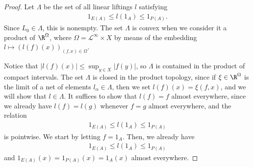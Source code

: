 \documentclass[10pt]{mypackage}
\begin{document}
\begin{proof}
  Let $\Lambda$ be the set of all linear liftings $l$ satisfying
  \begin{align*}
    1_{E(A)}\leq l\left( 1_A \right)\leq 1_{P(A)}.
  \end{align*}
  Since $L_0\in \Lambda$, this is nonempty. The set $\Lambda$ is convex when we consider it a product of $\R^{\Omega}$, where $\Omega = \mathcal{L}^{\infty}\times X$ by means of the embedding $l\mapsto \left( l(f)(x) \right)_{(f,x)\in \Omega}$.

  Notice that $\left\vert l(f)(x) \right\vert\leq \sup_{y\in X}\left\vert f(y) \right\vert$, so $\Lambda$ is contained in the product of compact intervals. The set $\Lambda$ is closed in the product topology, since if $\xi\in \R^{\Omega}$ is the limit of a net of elements $l_{\alpha}\in \Lambda$, then we set $l(f)(x) = \xi\left( f,x \right)$, and we will show that $l\in \Lambda$. It suffices to show that $l(f) = f$ almost everywhere, since we already have $l(f) = l(g)$ whenever $f = g$ almost everywhere, and the relation
  \begin{align*}
    1_{E(A)}\leq l\left(1_A\right)\leq 1_{P(A)}
  \end{align*}
  is pointwise. We start by letting $f = 1_A$. Then, we already have
  \begin{align*}
    1_{E(A)}\leq l\left( 1_A \right)\leq 1_{P(A)}
  \end{align*}
  and $1_{E(A)}(x) = 1_{P(A)}(x) = 1_{A}(x)$ almost everywhere. 
\end{proof}
\nocite{measure_theory_bogachev,folland_real_analysis}
\end{document}
